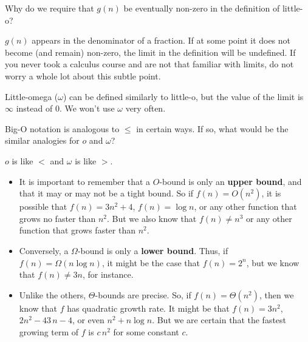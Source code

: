 \vspace*{-.1in}

\begin{ques}
Why do we require that $g(n)$ be eventually non-zero in the definition of little-o?

\noindent
\answerline
\begin{answer}
$g(n)$ appears in the denominator of a fraction.  If at some point it does not become 
(and remain) non-zero, the limit in the definition will be undefined.
If you never took a calculus course and are not that familiar with limits, 
do not worry a whole lot about this subtle point.
\end{answer}
\end{ques}

Little-omega ($\omega$) can be defined similarly to little-o, 
but the value of the limit is $\infty$ instead of $0$.
We won't use $\omega$ very often.

\begin{ques}
Big-O notation is analogous to $\leq$ in certain ways. 
If so, what would be the similar analogies for $o$ and $\omega$?

\noindent
\answerline
\begin{answer}
$o$ is like $<$ and $\omega$ is like $>$.
\end{answer}
\end{ques}

\begin{rem}
\begin{itemize}
\item
It is important to remember that a $O$-bound is only an {\bf upper bound},
and that it may or may not be a tight bound.
So if $f(n)=O(n^{2})$, it is possible that $f(n)=3n^2+4$, $f(n)=\log n$, or
any other function that grows no faster than $n^2$.  But we also know that 
$f(n)\neq n^3$ or any other function that grows faster than $n^2$.
\item
Conversely, a $\Omega$-bound is only a {\bf lower bound}.  
Thus, if $f(n)=\Omega(n\log n)$, it might be the case that 
$f(n)=2^n$, but we know that $f(n)\neq 3n$, for instance.
\item
Unlike the others, $\Theta$-bounds are precise.  So, if
$f(n)=\Theta(n^2)$, then we know that $f$ has quadratic growth rate.
It might be that $f(n)=3n^2$,  $2n^2-43\,n-4$, or even $n^2+n\log n$.
But we are certain that the fastest growing term of $f$ is $c\, n^2$ for some constant $c$.
\end{itemize}
\end{rem}


